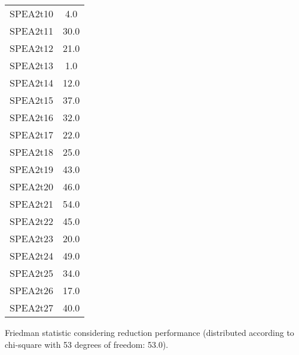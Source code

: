 \documentclass{article}
\begin{document}
\begin{table}[!htp]
\begin{tabular}{c|c}
SPEA2t10&4.0\\
SPEA2t11&30.0\\
SPEA2t12&21.0\\
SPEA2t13&1.0\\
SPEA2t14&12.0\\
SPEA2t15&37.0\\
SPEA2t16&32.0\\
SPEA2t17&22.0\\
SPEA2t18&25.0\\
SPEA2t19&43.0\\
SPEA2t20&46.0\\
SPEA2t21&54.0\\
SPEA2t22&45.0\\
SPEA2t23&20.0\\
SPEA2t24&49.0\\
SPEA2t25&34.0\\
SPEA2t26&17.0\\
SPEA2t27&40.0\\
\end{tabular}
\end{table}


Friedman statistic considering reduction performance (distributed according to chi-square with 53 degrees of freedom: 53.0).
\end{document}
